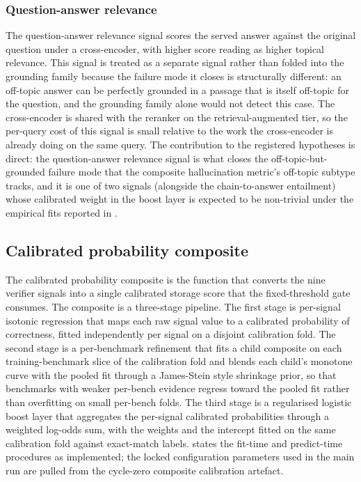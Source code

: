 \subsubsection{Question-answer relevance}
\label{sec:verifier-qa-rel}

The question-answer relevance signal scores the served answer against the original question under a cross-encoder, with higher score reading as higher topical relevance. This signal is treated as a separate signal rather than folded into the grounding family because the failure mode it closes is structurally different: an off-topic answer can be perfectly grounded in a passage that is itself off-topic for the question, and the grounding family alone would not detect this case. The cross-encoder is shared with the reranker on the retrieval-augmented tier, so the per-query cost of this signal is small relative to the work the cross-encoder is already doing on the same query. The contribution to the registered hypotheses is direct: the question-answer relevance signal is what closes the off-topic-but-grounded failure mode that the composite hallucination metric's off-topic subtype tracks, and it is one of two signals (alongside the chain-to-answer entailment) whose calibrated weight in the boost layer is expected to be non-trivial under the empirical fits reported in .

\subsection{Calibrated probability composite}
\label{sec:composite}

The calibrated probability composite is the function that converts the nine verifier signals into a single calibrated storage score that the fixed-threshold gate consumes. The composite is a three-stage pipeline. The first stage is per-signal isotonic regression that maps each raw signal value to a calibrated probability of correctness, fitted independently per signal on a disjoint calibration fold. The second stage is a per-benchmark refinement that fits a child composite on each training-benchmark slice of the calibration fold and blends each child's monotone curve with the pooled fit through a James-Stein style shrinkage prior, so that benchmarks with weaker per-bench evidence regress toward the pooled fit rather than overfitting on small per-bench folds. The third stage is a regularised logistic boost layer that aggregates the per-signal calibrated probabilities through a weighted log-odds sum, with the weights and the intercept fitted on the same calibration fold against exact-match labels.  states the fit-time and predict-time procedures as implemented; the locked configuration parameters used in the main run are pulled from the cycle-zero composite calibration artefact.

